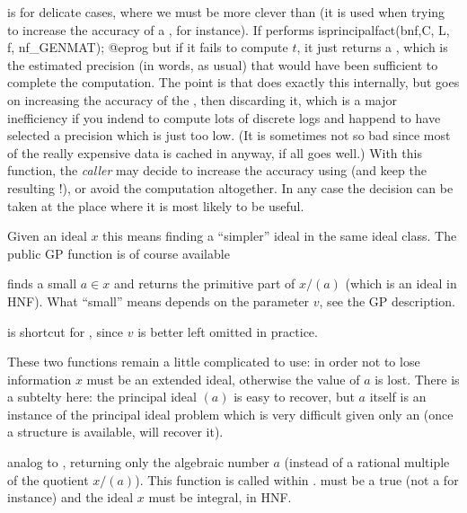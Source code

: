  is
for delicate cases, where we must be more clever than 
(it is used when trying to increase the accuracy of a , for
instance). If performs 
\bprog
  isprincipalfact(bnf,C, L, f, nf_GENMAT);
@eprog\noindent
but if it fails to compute $t$, it just returns a , which is the
estimated precision (in words, as usual) that would have been sufficient to
complete the computation. The point is that  does exactly this
internally, but goes on increasing the accuracy of the , then
discarding it, which is a major inefficiency if you indend to compute lots of
discrete logs and happend to have selected a precision which is just too low.
(It is sometimes not so bad since most of the really expensive data is cached
in  anyway, if all goes well.)  With this function, the \emph{caller}
may decide to increase the accuracy using  (and keep the
resulting !), or avoid the computation altogether. In any case the
decision can be taken at the place where it is most likely to be useful.


Given an ideal $x$ this means finding a ``simpler'' ideal in the same ideal
class. The public GP function is of course available

 finds a small $a\in x$ and returns
the primitive part of $x/(a)$ (which is an ideal in HNF). What ``small'' means
depends on the parameter $v$, see the GP description.

 is shortcut for ,
since $v$ is better left omitted in practice.

These two functions remain a little complicated to use: in order not to lose
information $x$ must be an extended ideal, otherwise the value of $a$ is lost.
There is a subtelty here: the principal ideal $(a)$ is easy to recover, but
$a$ itself is an instance of the principal ideal problem which is very
difficult given only an  (once a  structure is available,
 will recover it).

 analog to ,
returning only the algebraic number $a$ (instead of a rational multiple
of the quotient $x/(a)$). This function is called within .
 must be a true  (not a  for instance) and the
ideal $x$ must be integral, in HNF.


